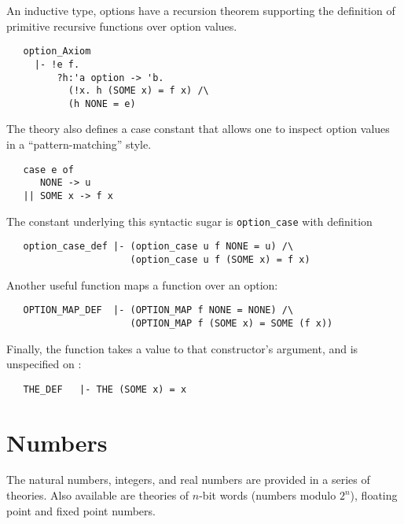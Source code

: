 An inductive type, options have a recursion theorem supporting the
definition of primitive recursive functions over option values.
%
\begin{hol}
\begin{verbatim}
   option_Axiom
     |- !e f.
         ?h:'a option -> 'b.
           (!x. h (SOME x) = f x) /\
           (h NONE = e)
\end{verbatim}
\end{hol}
The  theory also defines a case constant that allows
one to inspect option values in a ``pattern-matching'' style.
\begin{hol}
\begin{verbatim}
   case e of
      NONE -> u
   || SOME x -> f x
\end{verbatim}
\end{hol}
%
The constant underlying this syntactic sugar is \verb+option_case+
with definition
\begin{hol}
\begin{verbatim}
   option_case_def |- (option_case u f NONE = u) /\
                      (option_case u f (SOME x) = f x)
\end{verbatim}
\end{hol}
%
Another useful function maps a function over an option:
%
\begin{hol}
\begin{verbatim}
   OPTION_MAP_DEF  |- (OPTION_MAP f NONE = NONE) /\
                      (OPTION_MAP f (SOME x) = SOME (f x))
\end{verbatim}
\end{hol}
Finally, the \holtxt{THE} function takes a \holtxt{SOME}
value to that constructor's argument, and is unspecified on
:
\begin{hol}
\begin{verbatim}
   THE_DEF   |- THE (SOME x) = x
\end{verbatim}
\end{hol}

\section{Numbers}

The natural numbers, integers, and real numbers are provided in a
series of theories. Also available are theories of $n$-bit words
(numbers modulo $2^n$), floating point and fixed point numbers.

